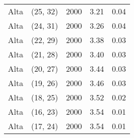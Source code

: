\begin{tabular}{c c c c c}
Alta & (25, 32) &  2000 & 3.21 & 0.04 \\
Alta & (24, 31) &  2000 & 3.26 & 0.04 \\
Alta & (22, 29) &  2000 & 3.38 & 0.03 \\
Alta & (21, 28) &  2000 & 3.40 & 0.03 \\
Alta & (20, 27) &  2000 & 3.44 & 0.03 \\
Alta & (19, 26) &  2000 & 3.46 & 0.03 \\
Alta & (18, 25) &  2000 & 3.52 & 0.02 \\
Alta & (16, 23) &  2000 & 3.54 & 0.01 \\
Alta & (17, 24) &  2000 & 3.54 & 0.01 \\
\hline
\end{tabular}

